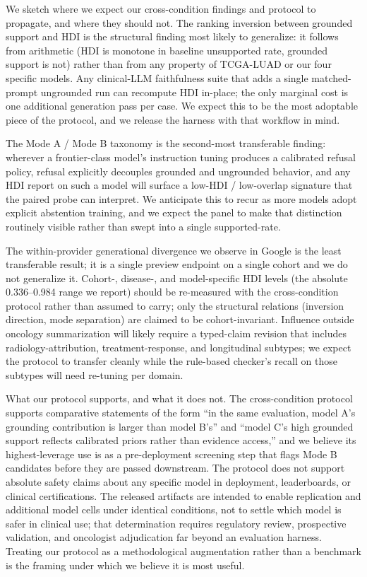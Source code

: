 \documentclass{article}
\theoremstyle{plain}
\begin{document}
We sketch where we expect our cross-condition findings and protocol to propagate, and where they should not. The ranking inversion between grounded support and HDI is the structural finding most likely to generalize: it follows from arithmetic (HDI is monotone in baseline unsupported rate, grounded support is not) rather than from any property of TCGA-LUAD or our four specific models. Any clinical-LLM faithfulness suite that adds a single matched-prompt ungrounded run can recompute HDI in-place; the only marginal cost is one additional generation pass per case. We expect this to be the most adoptable piece of the protocol, and we release the harness with that workflow in mind.

The Mode A / Mode B taxonomy is the second-most transferable finding: wherever a frontier-class model's instruction tuning produces a calibrated refusal policy, refusal explicitly decouples grounded and ungrounded behavior, and any HDI report on such a model will surface a low-HDI / low-overlap signature that the paired probe can interpret. We anticipate this to recur as more models adopt explicit abstention training, and we expect the panel to make that distinction routinely visible rather than swept into a single supported-rate.

The within-provider generational divergence we observe in Google is the least transferable result; it is a single preview endpoint on a single cohort and we do not generalize it. Cohort-, disease-, and model-specific HDI levels (the absolute 0.336--0.984 range we report) should be re-measured with the cross-condition protocol rather than assumed to carry; only the structural relations (inversion direction, mode separation) are claimed to be cohort-invariant. Influence outside oncology summarization will likely require a typed-claim revision that includes radiology-attribution, treatment-response, and longitudinal subtypes; we expect the protocol to transfer cleanly while the rule-based checker's recall on those subtypes will need re-tuning per domain.

What our protocol supports, and what it does not. The cross-condition protocol supports comparative statements of the form ``in the same evaluation, model A's grounding contribution is larger than model B's'' and ``model C's high grounded support reflects calibrated priors rather than evidence access,'' and we believe its highest-leverage use is as a pre-deployment screening step that flags Mode B candidates before they are passed downstream. The protocol does not support absolute safety claims about any specific model in deployment, leaderboards, or clinical certifications. The released artifacts are intended to enable replication and additional model cells under identical conditions, not to settle which model is safer in clinical use; that determination requires regulatory review, prospective validation, and oncologist adjudication far beyond an evaluation harness. Treating our protocol as a methodological augmentation rather than a benchmark is the framing under which we believe it is most useful.
\end{document}
